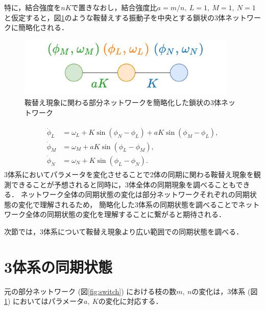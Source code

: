 \documentclass[../main]{subfiles}
\begin{document}
特に，結合強度を$nK$で置きなおし，結合強度比$a=m/n,\ L=1,\ M=1,\ N=1$と仮定すると，図\ref{fig:3body}のような鞍替えする振動子を中央とする鎖状の3体ネットワークに簡略化される．
\begin{figure}[tbp]
    \centering
    \includegraphics[width=105mm]{./images/three_obj_after.pdf}
    \centering
    \caption{鞍替え現象に関わる部分ネットワークを簡略化した鎖状の3体ネットワーク}
    \label{fig:3body}
\end{figure}
\begin{align}
    \label{eq:3body}
    \begin{split}
        \dot{\phi}_L&=\omega_L+K\sin\left( \phi_N-\phi_L \right)+aK\sin\left( \phi_M-\phi_L \right),\\
        \dot{\phi}_M&=\omega_M+aK\sin\left( \phi_L-\phi_M \right), \\
        \dot{\phi}_N&=\omega_N+K\sin\left( \phi_L-\phi_N \right).    
    \end{split}
\end{align}
3体系においてパラメータを変化させることで2体の同期に関わる鞍替え現象を観測できることが予想されると同時に，3体全体の同期現象を調べることもできる．
ネットワーク全体の同期状態の変化は部分ネットワークそれぞれの同期状態の変化で理解されるため，
簡略化した3体系の同期状態を調べることでネットワーク全体の同期状態の変化を理解することに繋がると期待される．

次節では，3体系について鞍替え現象より広い範囲での同期状態を調べる．
\section{3体系の同期状態}
\label{sec:3body-synchro-state}
元の部分ネットワーク (図\ref{fig:switch}) における枝の数$m,\ n$の変化は，3体系 (図\ref{fig:3body}) においてはパラメータ$a,\ K$の変化に対応する．
\end{document}
